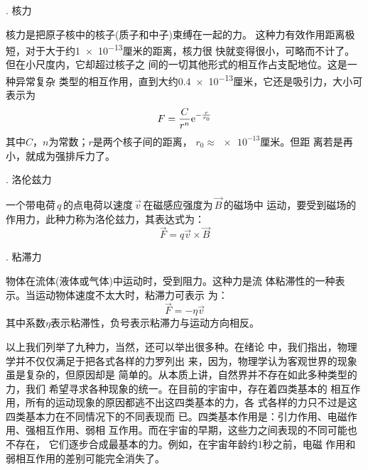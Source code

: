 . 核力 \normalfont

核力是把原子核中的核子(质子和中子)束缚在一起的力。
这种力有效作用距离极短，对于大于约\num{1e-13}厘米的距离，核力很
快就变得很小，可略而不计了。但在小尺度内，它却超过核子之
间的一切其他形式的相互作占支配地位。这是一种异常复杂
类型的相互作用，直到大约\num{0.4e-13}厘米，它还是吸引力，大小可表示为
\begin{equation}\label{eqn:03.04.06}
    F = \frac { C } { r ^ { n } } \mathrm e ^ { - \frac { r } { r_0 } }
\end{equation}
其中$ C $，$ n $为常数；$ r $是两个核子间的距离， $ r _ { 0 } \approx \num{e-13} $厘米。但距
离若是再小，就成为强排斥力了。

. 洛伦兹力 \normalfont

一个带电荷\,$ q $\,的点电荷以速度\,$\vec{v}$\,在磁感应强度为\,$\vec{B}$\,的磁场中
运动，要受到磁场的作用力，此种力称为洛伦兹力，其表达式为：
\begin{equation}\label{eqn:03.04.07}
    \vec{F} = q \vec{v} \times \vec{B}
\end{equation}

. 粘滞力 \normalfont

物体在流体(液体或气体)中运动时，受到阻力。这种力是流
体粘滞性的一种表示。当运动物体速度不太大时，粘滞力可表示
为：\vspace{-1em}
\begin{equation}\label{eqn:03.04.08}
    \vec{F} = - \eta \vec{v}
\end{equation}
其中系数$\eta$表示粘滞性，负号表示粘滞力与运动方向相反。

以上我们列举了九种力，当然，还可以举出很多种。在绪论
中，我们指出，物理学并不仅仅满足于把各式各样的力罗列出
来，因为，物理学认为客观世界的现象虽是复杂的，但原因却是
简单的。从本质上讲，自然界并不存在如此多种类型的力，我们
希望寻求各种现象的统一。在目前的宇宙中，存在着四类基本的
相互作用，所有的运动现象的原因都逃不出这四类基本的力，各
式各样的力只不过是这四类基本力在不同情况下的不同表现而
已。四类基本作用是：引力作用、电磁作用、强相互作用、弱相
互作用。而在宇宙的早期，这些力之间表现的不同可能也不存在，
它们逐步合成最基本的力。例如，在宇宙年龄约1秒之前，电磁
作用和弱相互作用的差别可能完全消失了。



